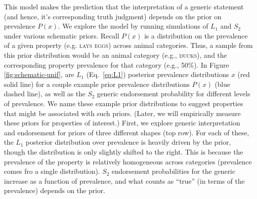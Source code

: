 \documentclass[12pt,letterpaper]{article}
\begin{document}
This model makes the prediction that the interpretation of a generic statement (and hence, it's corresponding truth judgment) depends on the prior on prevalence $P(x)$.
We explore the model by running simulations of $L_1$ and $S_2$ under various schematic priors.
Recall $P(x)$ is a distribution on the prevalence of a given property (e.g. \textsc{lays eggs}) across animal categories. 
Thus, a sample from this prior distribution would be an animal category (e.g., \textsc{ducks}), and the corresponding property prevalence for that category (e.g., 50\%).
In Figure \ref{fig:schematic-unif}, are $L_1$ (Eq.~\ref{eq:L1}) posterior prevalence distributions $x$ (red solid line) for a couple example prior prevalence distributions $P(x)$ (blue dashed line), as well as the $S_2$ generic endorsement probability for different levels of prevalence.
We name these example prior distributions to suggest properties that might be associated with such priors. (Later, we will empirically measure these priors for properties of interest.)
First, we explore generic interpretation and endorsement for priors of three different shapes (top row). 
For each of these, the $L_1$ posterior distribution over prevalence is heavily driven by the prior, though the distribution is only slightly shifted to the right. 
This is because the prevalence of the property is relatively homogeneous across categories (prevalence comes fro a single distribution). 
$S_2$ endorsement probabilities for the generic increase as a function of prevalence, and what counts as ``true'' (in terms of the prevalence) depends on the prior. 
\end{document}

